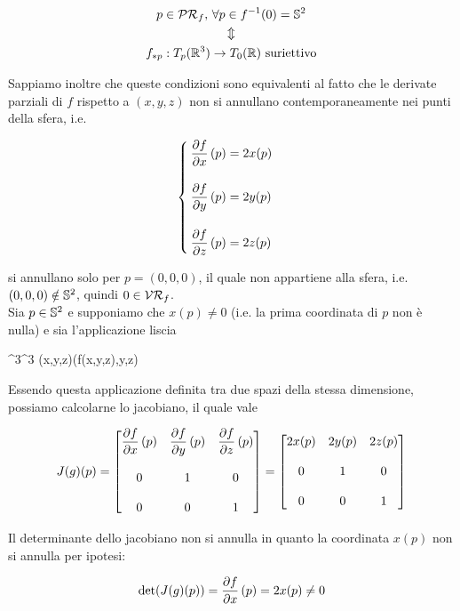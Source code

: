\begin{gather}
	p \in \PR_{f}, \, \forall p \in f^{-1}(0) = \S^{2} \nonumber\\
	\Updownarrow\\
	f_{*p} : T_{p}(\R^{3}) \to T_{0}(\R) \text{ suriettivo} \nonumber
\end{gather}

Sappiamo inoltre che queste condizioni sono equivalenti al fatto che le derivate parziali di $ f $ rispetto a $ (x,y,z) $ non si annullano contemporaneamente nei punti della sfera, i.e.

\begin{equation}
	\begin{cases}
		\dpdv{f}{x} \, (p) = 2x(p)\\\\
		\dpdv{f}{y} \, (p) = 2y(p)\\\\
		\dpdv{f}{z} \, (p) = 2z(p)
	\end{cases}
\end{equation}

si annullano solo per $ p = (0,0,0) $, il quale non appartiene alla sfera, i.e. $ (0,0,0) \notin \S^{2} $, quindi $ 0 \in \VR_{f} $.\\
Sia $ p \in \S^{2} $ e supponiamo che $ x(p) \neq 0 $ (i.e. la prima coordinata di $ p $ non è nulla) e sia l'applicazione liscia

	{\R^{3}}{\R^{3}}
	{(x,y,z)}{(f(x,y,z),y,z)}

Essendo questa applicazione definita tra due spazi della stessa dimensione, possiamo calcolarne lo jacobiano, il quale vale

\begin{equation}
	J(g)(p) = \bmqty{ \dpdv{f}{x} \, (p) & \dpdv{f}{y} \, (p) & \dpdv{f}{z} \, (p) \\\\ 0 & 1 & 0 \\\\ 0 & 0 & 1 } %
	= \bmqty{ 2x(p) & 2y(p) & 2z(p) \\\\ 0 & 1 & 0 \\\\ 0 & 0 & 1 }
\end{equation}

Il determinante dello jacobiano non si annulla in quanto la coordinata $ x(p) $ non si annulla per ipotesi:

\begin{equation}
	\det(J(g)(p)) = \pdv{f}{x} \, (p) = 2x(p) \neq 0
\end{equation}

